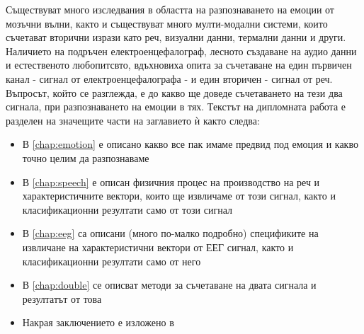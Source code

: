 \documentclass[main.tex]{subfiles}
\begin{document}
Съществуват много изследвания в областта на разпознаването на емоции от мозъчни вълни, както и съществуват много мулти-модални системи, които съчетават вторични изрази като реч, визуални данни, термални данни и други. Наличието на подръчен електроенцефалограф, лесното създаване на аудио данни и естественото любопитсвто, вдъхновиха опита за съчетаване на един първичен канал - сигнал от електроенцефалографа - и един вторичен - сигнал от реч. Въпросът, който се разглежда, е до какво ще доведе съчетаването на тези два сигнала, при разпознаването на емоции в тях. Текстът на дипломната работа е разделен на значещите части на заглавието ѝ както следва:
\begin{itemize}
    \item В \autoref{chap:emotion} е описано какво все пак имаме предвид под емоция и какво точно целим да разпознаваме
    \item В \autoref{chap:speech} е описан физичния процес на производство на реч и характеристичните вектори, които ще извличаме от този сигнал, както и класификационни резултати само от този сигнал
    \item В \autoref{chap:eeg} са описани (много по-малко подробно) спецификите на извличане на характеристични вектори от ЕЕГ сигнал, както и класификационни резултати само от него
    \item В \autoref{chap:double} се описват методи за съчетаване на двата сигнала и резултатът от това
    \item Накрая заключението е изложено в  
\end{itemize}
\end{document}
